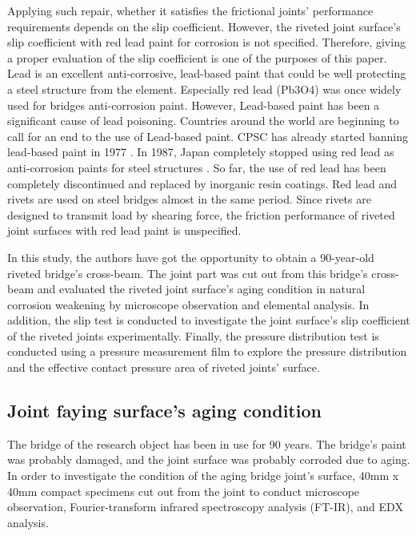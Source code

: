 Applying such repair, whether it satisfies the frictional joints' performance requirements depends on the slip coefficient. However, the riveted joint surface's slip coefficient with red lead paint for corrosion is not specified. Therefore, giving a proper evaluation of the slip coefficient is one of the purposes of this paper.
Lead is an excellent anti-corrosive, lead-based paint that could be well protecting a steel structure from the element. Especially red lead (Pb3O4) was once widely used for bridges anti-corrosion paint. However, Lead-based paint has been a significant cause of lead poisoning. Countries around the world are beginning to call for an end to the use of Lead-based paint. \ac{CPSC} has already started banning lead-based paint in 1977 \cite{CPSC1977}. In 1987, Japan completely stopped using red lead as anti-corrosion paints for steel structures \cite{rtri1987Steel}. So far, the use of red lead has been completely discontinued and replaced by inorganic resin coatings. Red lead and rivets are used on steel bridges almost in the same period. Since rivets are designed to transmit load by shearing force, the friction performance of riveted joint surfaces with red lead paint is unspecified. 

In this study, the authors have got the opportunity to obtain a 90-year-old riveted bridge's cross-beam. The joint part was cut out from this bridge's cross-beam and evaluated the riveted joint surface's aging condition in natural corrosion weakening by microscope observation and elemental analysis. In addition, the slip test is conducted to investigate the joint surface's slip coefficient of the riveted joints experimentally. Finally, the pressure distribution test is conducted using a pressure measurement film to explore the pressure distribution and the effective contact pressure area of riveted joints' surface.


\subsection{Joint faying surface's aging condition}

The bridge of the research object has been in use for 90 years. The bridge's paint was probably damaged, and the joint surface was probably corroded due to aging. In order to investigate the condition of the aging bridge joint's surface, 40mm x 40mm compact specimens cut out from the joint to conduct microscope observation, Fourier-transform infrared spectroscopy analysis (FT-IR), and \ac{EDX} analysis.

